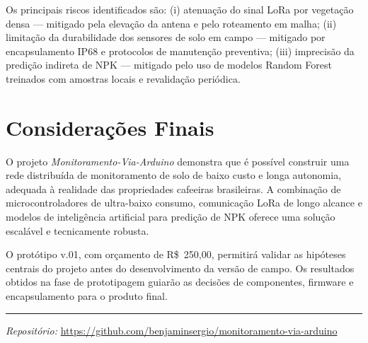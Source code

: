\documentclass[12pt,a4paper]{article}
\begin{document}
Os principais riscos identificados são: (i) atenuação do sinal LoRa por vegetação
densa --- mitigado pela elevação da antena e pelo roteamento em malha; (ii) limitação
da durabilidade dos sensores de solo em campo --- mitigado por encapsulamento IP68 e
protocolos de manutenção preventiva; (iii) imprecisão da predição indireta de NPK
--- mitigado pelo uso de modelos Random Forest treinados com amostras locais e
revalidação periódica.

\section{Considerações Finais}

O projeto \textit{Monitoramento-Via-Arduino} demonstra que é possível construir uma
rede distribuída de monitoramento de solo de baixo custo e longa autonomia,
adequada à realidade das propriedades cafeeiras brasileiras. A combinação de
microcontroladores de ultra-baixo consumo, comunicação LoRa de longo alcance e
modelos de inteligência artificial para predição de NPK oferece uma solução
escalável e tecnicamente robusta.

O protótipo v.01, com orçamento de R\$~250,00, permitirá validar as hipóteses
centrais do projeto antes do desenvolvimento da versão de campo. Os resultados
obtidos na fase de prototipagem guiarão as decisões de componentes, firmware e
encapsulamento para o produto final.

\vspace{1em}
\hrule
\vspace{0.5em}
{\small \textit{Repositório:} \url{https://github.com/benjaminsergio/monitoramento-via-arduino}}
\end{document}
